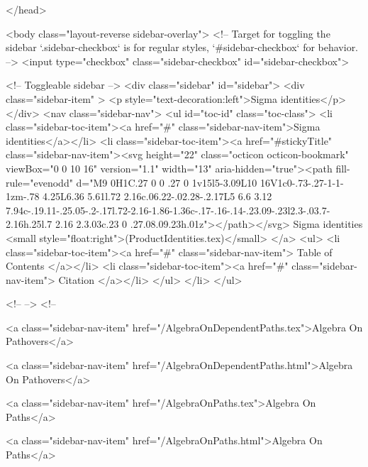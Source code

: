 </head>


  <body class="layout-reverse sidebar-overlay">
    <!-- Target for toggling the sidebar `.sidebar-checkbox` is for regular
     styles, `#sidebar-checkbox` for behavior. -->
<input type="checkbox" class="sidebar-checkbox" id="sidebar-checkbox">

<!-- Toggleable sidebar -->
<div class="sidebar" id="sidebar">
  <div class="sidebar-item" >
    <p style="text-decoration:left">Sigma identities</p>
  </div>
  <nav class="sidebar-nav">
    <ul id="toc-id" class="toc-class">
  <li class="sidebar-toc-item"><a href="#" class="sidebar-nav-item">Sigma identities</a></li>
  <li class="sidebar-toc-item"><a href="#stickyTitle" class="sidebar-nav-item"><svg height="22" class="octicon octicon-bookmark" viewBox="0 0 10 16" version="1.1" width="13" aria-hidden="true"><path fill-rule="evenodd" d="M9 0H1C.27 0 0 .27 0 1v15l5-3.09L10 16V1c0-.73-.27-1-1-1zm-.78 4.25L6.36 5.61l.72 2.16c.06.22-.02.28-.2.17L5 6.6 3.12 7.94c-.19.11-.25.05-.2-.17l.72-2.16-1.86-1.36c-.17-.16-.14-.23.09-.23l2.3-.03.7-2.16h.25l.7 2.16 2.3.03c.23 0 .27.08.09.23h.01z"></path></svg> Sigma identities <small style="float:right">(ProductIdentities.tex)</small>
</a>
    <ul>
      <li class="sidebar-toc-item"><a href="#" class="sidebar-nav-item"> Table of Contents </a></li>
      <li class="sidebar-toc-item"><a href="#" class="sidebar-nav-item"> Citation </a></li>
    </ul>
  </li>
</ul>


    <!--  -->
    <!-- 
      
    
      
    
      
    
      
        
      
    
      
        
          <a class="sidebar-nav-item" href="/AlgebraOnDependentPaths.tex">Algebra On Pathovers</a>
        
      
    
      
        
          <a class="sidebar-nav-item" href="/AlgebraOnDependentPaths.html">Algebra On Pathovers</a>
        
      
    
      
        
          <a class="sidebar-nav-item" href="/AlgebraOnPaths.tex">Algebra On Paths</a>
        
      
    
      
        
          <a class="sidebar-nav-item" href="/AlgebraOnPaths.html">Algebra On Paths</a>
        
